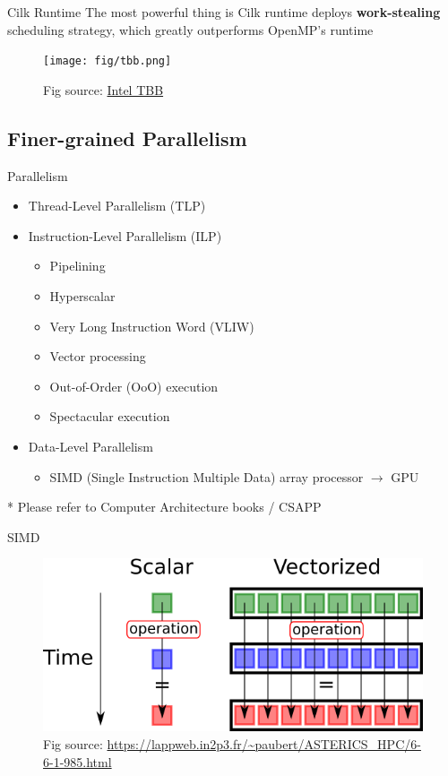\documentclass{../TexTemplate/myslide}
\begin{document}
\begin{frame}{Cilk Runtime}
The most powerful thing is Cilk runtime deploys \textbf{work-stealing} scheduling strategy, which greatly outperforms OpenMP's runtime
\begin{figure}[H]
\centering
\texttt{[image: fig/tbb.png]}
\caption*{\small Fig source: \href{https://csdl-images.computer.org/mags/so/2011/01/figures/mso20110100232.gif}{Intel TBB}}
\end{figure}
\end{frame}

\subsection{Finer-grained Parallelism}
\begin{frame}
\subsectionpage
\end{frame}

\begin{frame}{Parallelism}
\begin{itemize}
	\item Thread-Level Parallelism (TLP)
	\item Instruction-Level Parallelism (ILP)
	\begin{itemize}
		\item Pipelining
		\item Hyperscalar
		\item Very Long Instruction Word (VLIW)
		\item Vector processing
		\item Out-of-Order (OoO) execution
		\item Spectacular execution
	\end{itemize}
	\item Data-Level Parallelism
	\begin{itemize}
		\item SIMD (Single Instruction Multiple Data) array processor $\to$ GPU
	\end{itemize}
\end{itemize}
* Please refer to Computer Architecture books / CSAPP
\end{frame}

\begin{frame}{SIMD}
\begin{figure}
\centering
\includegraphics[width=0.8\linewidth]{fig/vectorization.png}
\caption*{\small Fig source: \url{https://lappweb.in2p3.fr/~paubert/ASTERICS_HPC/6-6-1-985.html}}
\end{figure}
\end{frame}
\end{document}
